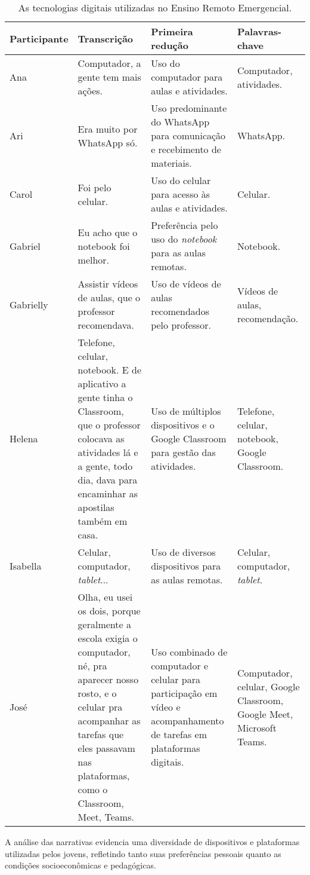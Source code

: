 \documentclass[portuguese]{textolivre}
\begin{document}
\begin{table}[htbp]
\caption{As tecnologias digitais utilizadas no Ensino Remoto
Emergencial.}
\label{tbl2}
\small
\centering
\begin{tabular}{p{1.5cm} >{\raggedright\arraybackslash}p{4.5cm} >{\raggedright\arraybackslash}p{4cm} >{\raggedright\arraybackslash}p{3cm}}
\toprule
Participante & Transcrição & Primeira redução & Palavras-chave \\
\midrule
Ana & Computador, a gente tem mais ações. & Uso do computador para aulas
e atividades. & Computador, atividades. \\
Ari & Era muito por WhatsApp só. & Uso predominante do
WhatsApp para comunicação e recebimento de materiais. &
WhatsApp. \\
Carol & Foi pelo celular. & Uso do celular para acesso às aulas e
atividades. & Celular. \\
Gabriel & Eu acho que o notebook foi melhor. & Preferência pelo uso do
\emph{notebook} para as aulas remotas. & Notebook. \\
Gabrielly & Assistir vídeos de aulas, que o professor recomendava. & Uso
de vídeos de aulas recomendados pelo professor. & Vídeos de aulas,
recomendação. \\
Helena & Telefone, celular, notebook. E de aplicativo a gente
tinha o Classroom, que o professor colocava as atividades lá e a
gente, todo dia, dava para encaminhar as apostilas também em casa. & Uso
de múltiplos dispositivos e o Google Classroom para gestão das
atividades. & Telefone, celular, notebook, Google Classroom. \\
Isabella & Celular, computador, \emph{tablet}... & Uso de diversos
dispositivos para as aulas remotas. & Celular, computador,
\emph{tablet}. \\
José & Olha, eu usei os dois, porque geralmente a escola exigia o
computador, né, pra aparecer nosso rosto, e o celular pra acompanhar as
tarefas que eles passavam nas plataformas, como o Classroom, Meet,
Teams. & Uso combinado de computador e celular para participação em
vídeo e acompanhamento de tarefas em plataformas digitais. & Computador,
celular, Google Classroom, Google Meet, Microsoft Teams. \\
\bottomrule
\end{tabular}
\end{table}

A análise das narrativas evidencia uma diversidade de dispositivos e plataformas utilizadas pelos jovens, refletindo tanto suas preferências pessoais quanto as condições socioeconômicas e pedagógicas.
\end{document}
